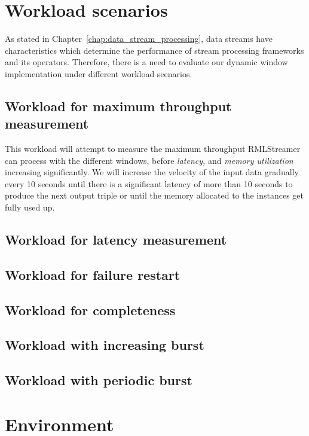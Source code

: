 \section{Workload scenarios}
As stated in Chapter~\ref{chap:data_stream_processing}, data streams have characteristics 
which determine the performance of stream processing frameworks and its operators. Therefore, 
there is a need to evaluate our dynamic window implementation under different workload scenarios. 

\subsection{Workload for maximum throughput measurement}
This workload will attempt to measure the maximum throughput RMLStreamer can 
process with the different windows, before \emph{latency,} and \emph{memory utilization}
increasing significantly. We will increase the velocity of the input data gradually 
every 10 seconds until there is a significant latency of more than 10 seconds to produce
the next output triple or until the memory allocated to the instances get fully used up. 


\subsection{Workload for latency measurement}



\subsection{Workload for failure restart}


\subsection{Workload for completeness}

\subsection{Workload with increasing burst }

\subsection{Workload with periodic burst}


\section{Environment}




